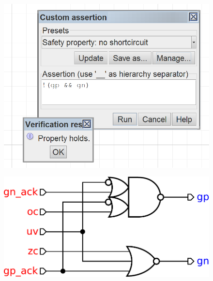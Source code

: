 \documentclass[british, journal]{IEEEtran}
\begin{document}
\begin{figure}[H]
	\begin{centering}
		\includegraphics[scale=0.75]{Images/screenshot-custom-assertion}
		\par\end{centering}
	\begin{centering}
		\par\end{centering}
	\vspace{-3mm}
\end{figure}

\begin{figure}[H]
	\begin{centering}
		\includegraphics[scale=0.35]{Images/complex-gate-circuit-buck}
		\par\end{centering}
	
\end{figure}
\end{document}
